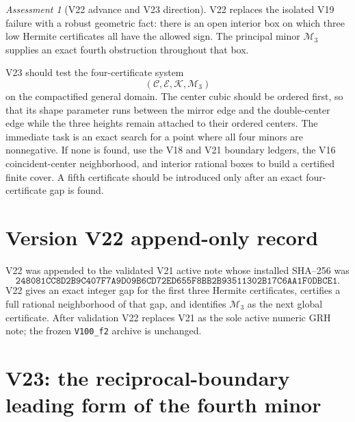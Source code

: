\documentclass[11pt]{article}
\theoremstyle{definition}
\theoremstyle{remark}
\newtheorem{assessment}[theorem]{Assessment}
\begin{document}
\begin{assessment}[V22 advance and V23 direction]
\label{ass:f2v22}
V22 replaces the isolated V19 failure with a robust geometric fact: there
is an open interior box on which three low Hermite certificates all have
the allowed sign.  The principal minor \(\mathcal M_3\) supplies an exact
fourth obstruction throughout that box.

V23 should test the four-certificate system
\[
 (\mathcal C,\mathcal E,\mathcal K,\mathcal M_3)
 \tag{N22.18}
\]
on the compactified general domain.  The center cubic should be ordered
first, so that its shape parameter runs between the mirror edge and the
double-center edge while the three heights remain attached to their
ordered centers.  The immediate task is an exact search for a point where
all four minors are nonnegative.  If none is found, use the V18 and V21
boundary ledgers, the V16 coincident-center neighborhood, and interior
rational boxes to build a certified finite cover.  A fifth certificate
should be introduced only after an exact four-certificate gap is found.
\end{assessment}

\section*{Version V22 append-only record}

V22 was appended to the validated V21 active note whose installed SHA--256
was
\[
 \texttt{248081CC8D2B9C407F7A9D09B6CD72ED655F8BB2B93511302B17C6AA1F0DBCE1}.
 \tag{N22.19}
\]
V22 gives an exact integer gap for the first three Hermite certificates,
certifies a full rational neighborhood of that gap, and identifies
\(\mathcal M_3\) as the next global certificate.  After validation V22
replaces V21 as the sole active numeric GRH note; the frozen
\texttt{V100\_f2} archive is unchanged.



\section{V23: the reciprocal-boundary leading form of the fourth minor}
\label{sec:f2v23-reciprocal}
\end{document}
